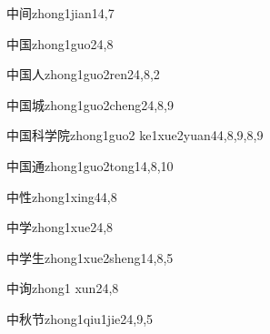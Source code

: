 \begin{verbete}{中间}{zhong1jian1}{4,7}
\end{verbete}

\begin{verbete}{中国}{zhong1guo2}{4,8}
\end{verbete}

\begin{verbete}{中国人}{zhong1guo2ren2}{4,8,2}
\end{verbete}

\begin{verbete}{中国城}{zhong1guo2cheng2}{4,8,9}
\end{verbete}

\begin{verbete}{中国科学院}{zhong1guo2 ke1xue2yuan4}{4,8,9,8,9}
\end{verbete}

\begin{verbete}{中国通}{zhong1guo2tong1}{4,8,10}
\end{verbete}

\begin{verbete}{中性}{zhong1xing4}{4,8}
\end{verbete}

\begin{verbete}{中学}{zhong1xue2}{4,8}
\end{verbete}

\begin{verbete}{中学生}{zhong1xue2sheng1}{4,8,5}
\end{verbete}

\begin{verbete}{中询}{zhong1 xun2}{4,8}
\end{verbete}

\begin{verbete}{中秋节}{zhong1qiu1jie2}{4,9,5}
\end{verbete}

